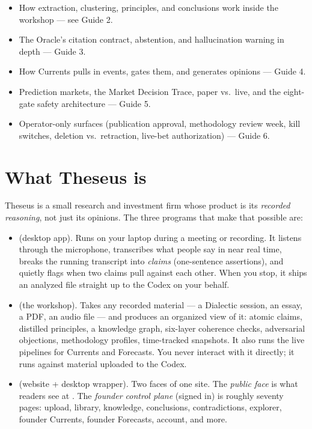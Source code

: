 \documentclass[11pt]{article}
\begin{document}
\begin{notcovered}
\begin{itemize}[leftmargin=*,itemsep=0.2em,topsep=0.2em]
  \item How extraction, clustering, principles, and conclusions work
        inside the workshop --- see Guide 2.
  \item The Oracle's citation contract, abstention, and hallucination
        warning in depth --- Guide 3.
  \item How Currents pulls in events, gates them, and generates
        opinions --- Guide 4.
  \item Prediction markets, the Market Decision Trace, paper vs.\ live,
        and the eight-gate safety architecture --- Guide 5.
  \item Operator-only surfaces (publication approval, methodology
        review week, kill switches, deletion vs.\ retraction, live-bet
        authorization) --- Guide 6.
\end{itemize}
\end{notcovered}

\section{What Theseus is}

Theseus is a small research and investment firm whose product is its
\emph{recorded reasoning}, not just its opinions. The three programs
that make that possible are:

\begin{itemize}[leftmargin=*,itemsep=0.4em]
  \item {} (desktop app). Runs on your laptop during a
        meeting or recording. It listens through the microphone,
        transcribes what people say in near real time, breaks the
        running transcript into \emph{claims} (one-sentence
        assertions), and quietly flags when two claims pull against
        each other. When you stop, it ships an analyzed file straight
        up to the Codex on your behalf.
  \item {} (the workshop). Takes any recorded material
        --- a Dialectic session, an essay, a PDF, an audio file --- and
        produces an organized view of it: atomic claims, distilled
        principles, a knowledge graph, six-layer coherence checks,
        adversarial objections, methodology profiles, time-tracked
        snapshots. It also runs the live pipelines for Currents and
        Forecasts. You never interact with it directly; it runs against
        material uploaded to the Codex.
  \item {} (website + desktop wrapper). Two faces of
        one site. The \emph{public face} is what readers see at
        . The \emph{founder control plane}
        (signed in) is roughly seventy pages: upload, library,
        knowledge, conclusions, contradictions, explorer, founder
        Currents, founder Forecasts, account, and more.
\end{itemize}
\end{document}
